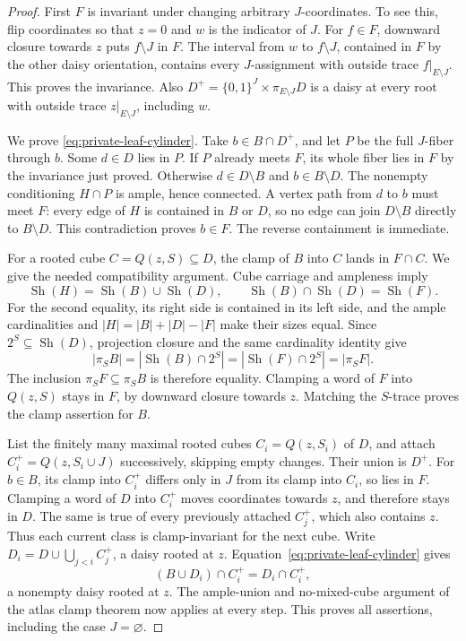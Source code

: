 \documentclass[11pt]{article}
\theoremstyle{definition}
\newcommand{\Sh}{\operatorname{Sh}}
\begin{document}
\begin{proof}
First $F$ is invariant under changing arbitrary $J$-coordinates. To
see this, flip coordinates so that $z=0$ and $w$ is the indicator of
$J$. For $f\in F$, downward closure towards $z$ puts $f\setminus J$
in $F$. The interval from $w$ to $f\setminus J$, contained in $F$
by the other daisy orientation, contains every $J$-assignment with
outside trace $f|_{E\setminus J}$. This proves the invariance.
Also $D^+=\{0,1\}^J\times\pi_{E\setminus J}D$ is a daisy at every
root with outside trace $z|_{E\setminus J}$, including $w$.

We prove \eqref{eq:private-leaf-cylinder}. Take $b\in B\cap D^+$,
and let $P$ be the full $J$-fiber through $b$. Some $d\in D$ lies in
$P$. If $P$ already meets $F$, its whole fiber lies in $F$ by the
invariance just proved. Otherwise $d\in D\setminus B$ and
$b\in B\setminus D$. The nonempty conditioning $H\cap P$ is ample,
hence connected. A vertex path from $d$ to $b$ must meet $F$:
every edge of $H$ is contained in $B$ or $D$, so no edge can join
$D\setminus B$ directly to $B\setminus D$. This contradiction proves
$b\in F$. The reverse containment is immediate.

For a rooted cube $C=Q(z,S)\subseteq D$, the clamp of $B$ into $C$
lands in $F\cap C$. We give the needed compatibility argument.
Cube carriage and ampleness imply
\[
 \Sh(H)=\Sh(B)\cup\Sh(D),\qquad
 \Sh(B)\cap\Sh(D)=\Sh(F).
\]
For the second equality, its right side is contained in its left side,
and the ample cardinalities and $|H|=|B|+|D|-|F|$ make their sizes
equal. Since $2^S\subseteq\Sh(D)$, projection closure and the same
cardinality identity give
\[
 |\pi_SB|=|\Sh(B)\cap2^S|=|\Sh(F)\cap2^S|=|\pi_SF|.
\]
The inclusion $\pi_SF\subseteq\pi_SB$ is therefore equality.
Clamping a word of $F$ into $Q(z,S)$ stays in $F$, by downward closure
towards $z$. Matching the $S$-trace proves the clamp assertion for $B$.

List the finitely many maximal rooted cubes $C_i=Q(z,S_i)$ of $D$,
and attach $C_i^+=Q(z,S_i\cup J)$ successively, skipping empty changes.
Their union is $D^+$. For $b\in B$, its clamp into $C_i^+$ differs
only in $J$ from its clamp into $C_i$, so lies in $F$.
Clamping a word of $D$ into $C_i^+$ moves coordinates towards $z$,
and therefore stays in $D$. The same is true of every previously
attached $C_j^+$, which also contains $z$. Thus each current class
is clamp-invariant for the next cube.
Write $D_i=D\cup\bigcup_{j<i}C_j^+$, a daisy rooted at $z$.
Equation~\eqref{eq:private-leaf-cylinder} gives
\[
 (B\cup D_i)\cap C_i^+=D_i\cap C_i^+,
\]
a nonempty daisy rooted at $z$. The ample-union and no-mixed-cube
argument of the atlas clamp theorem now applies at every step.
This proves all assertions, including the case $J=\varnothing$.
\end{proof}
\end{document}
